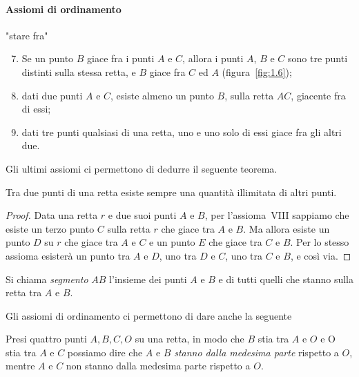 {\paragraph{Assiomi di ordinamento} "stare fra"
\begin{enumerate}[label=\Roman{*}.]
\setcounter{enumi}{6}
\item Se un punto $ B $ giace fra i punti $ A $ e $ C $, allora i punti $ A $, $ B $ e $ C $ sono tre punti distinti sulla stessa retta, e $ B $ giace fra $ C $ ed $ A $ (figura~\ref{fig:1.6});
\item dati due punti $ A $ e $ C $, esiste almeno un punto $ B $, sulla retta $ AC $, giacente fra di essi;
\item dati tre punti qualsiasi di una retta, uno e uno solo di essi giace fra gli altri due.
\end{enumerate}
Gli ultimi assiomi ci permettono di dedurre il seguente teorema.
\begin{teorema}
Tra due punti di una retta esiste sempre una quantità illimitata di altri punti.
\end{teorema}
\begin{proof}
Data una retta $ r $ e due suoi punti $ A $ e $ B $, per l'assioma~VIII sappiamo che esiste un terzo punto $ C $ sulla retta $ r $ che giace tra $ A $ e $ B $. Ma allora esiste un punto $ D $ su $ r $ che giace tra $ A $ e $ C $ e un punto $ E $ che giace tra $ C $ e $ B $. Per lo stesso assioma esisterà un punto tra $ A $ e $ D $, uno tra $ D $ e $ C $, uno tra $ C $ e $ B $, e così via.
\end{proof}
\begin{center}

\end{center}
\begin{definizione}
Si chiama \emph{segmento} $ AB $ l'insieme dei punti $ A $ e $ B $ e di tutti quelli che stanno sulla retta tra $ A $ e $ B $.
\end{definizione}
Gli assiomi di ordinamento ci permettono di dare anche la seguente

\begin{definizione}
Presi quattro punti $ A, B, C, O $ su una retta, in modo che $ B $ stia tra $ A $ e $ O $ e O stia tra $ A $ e $ C $ possiamo dire che $ A $ e $ B $ \emph{stanno dalla medesima parte} rispetto a $ O $, mentre $ A $ e $ C $ non stanno dalla medesima parte rispetto a $ O $.
\end{definizione}
\begin{center}

\end{center}

}

